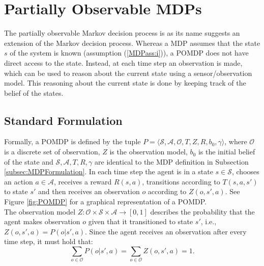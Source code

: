 
\section{Partially Observable MDPs}\label{sec:POMDP}
The partially observable Markov decision process is as its name suggests an extension of the Markov decision process. Whereas a MDP assumes that the state $s$ of the system is known (assumption (\ref{MDPass:i})), a POMDP does not have direct access to the state. Instead, at each time step an observation is made, which can be used to reason about the current state using a sensor/observation model. This reasoning about the current state is done by keeping track of the belief of the states.
\subsection{Standard Formulation}
Formally, a POMDP is defined by the tuple $P = \langle \mathcal{S}, \mathcal{A}, \mathcal{O}, T, Z, R, b_0, \gamma \rangle$, where $\mathcal{O}$ is a discrete set of observation, $Z$ is the observation model, $b_0$ is the initial belief of the state and $\mathcal{S}, \mathcal{A}, T, R, \gamma$ are identical to the MDP definition in Subsection \ref{subsec:MDPFormulation}. In each time step the agent is in a state $s\in\mathcal{S}$, chooses an action $a\in\mathcal{A}$, receives a reward $R(s,a)$, transitions according to $T(s,a,s')$ to state $s'$ and then receives an observation $o$ according to $Z(o, s', a)$. See Figure \ref{fig:POMDP} for a graphical representation of a POMDP.\\ 

The observation model $Z:\mathcal{O}\times\mathcal{S}\times\mathcal{A}\rightarrow [0, 1]$ describes the probability that the agent makes observation $o$ given that it transitioned to state $s'$, i.e., $Z(o,s',a) = P(o|s',a)$. Since the agent receives an observation after every time step, it must hold that:
\begin{equation}
    \sum_{o\in\mathcal{O}}P(o|s',a) = \sum_{o\in\mathcal{O}}Z(o,s', a) = 1.
\end{equation}

